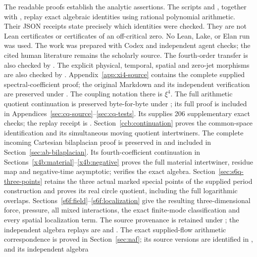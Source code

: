 \documentclass[11pt,a4paper]{article}
\theoremstyle{definition}
\theoremstyle{plain}
\begin{document}
The readable proofs establish the analytic assertions. The scripts
 and
, together with
, replay exact algebraic
identities using rational polynomial arithmetic. Their JSON receipts
state precisely which identities were checked. They are not Lean
certificates or certificates of an off-critical zero. No Lean, Lake, or
Elan run was used. The work was prepared with Codex and independent
agent checks; the cited human literature remains the scholarly source.
The fourth-order transfer is also checked by
. The explicit physical, temporal,
spatial and zero-jet morphisms are also checked by
. Appendix~\ref{app:xi4-source}
contains the complete supplied spectral-coefficient proof; the original
Markdown and its independent verification are preserved under
. The coupling notation there is $\xi^4$.
The full arithmetic quotient continuation is preserved byte-for-byte
under ; its full proof is included
in Appendices~\ref{sec:cq-source}--\ref{sec:cq-tests}.
Its  supplies 206 supplementary exact
checks; the replay receipt is .
Section~\ref{ccb:continuation} proves the common-space identification
and its simultaneous moving quotient intertwiners.
The complete incoming Cartesian bilaplacian proof is preserved in
 and included in
Section~\ref{sec:ab-bilaplacian}. Its fourth-coefficient continuation
in Sections~\ref{x4b:material}--\ref{x4b:negative} proves the full
material intertwiner, residue map and negative-time asymptotic;
 verifies the exact algebra.
Section~\ref{sec:s6q-three-points} retains the three actual marked
special points of the supplied period construction and proves its
real circle quotient, including the full logarithmic overlaps.
Sections~\ref{s6f:field}--\ref{s6f:localization} give the resulting
three-dimensional force, pressure, all mixed interactions, the exact
finite-mode classification and every spatial localization term.
The source provenance is retained under
; the independent algebra replays are
 and
.
The exact supplied-flow arithmetic correspondence is proved in
Section~\ref{sec:naf}; its source versions are identified in
, and its independent algebra
\end{document}
